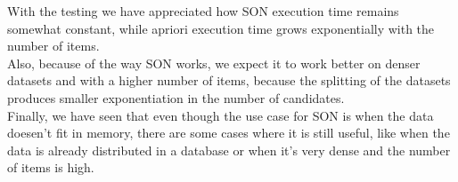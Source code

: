 \documentclass[a4paper]{article}
\begin{document}
	With the testing we have appreciated how SON execution time remains somewhat constant, while apriori execution time grows exponentially with the number of items.\\
	Also, because of the way SON works, we expect it to work better on denser datasets and with a higher number of items, because the splitting of the datasets produces
	smaller exponentiation in the number of candidates.\\
	
	Finally, we have seen that even though the use case for SON is when the data doesen't fit in memory, there are some cases where it is still useful, like when the data is
	already distributed in a database or when it's very dense and the number of items is high.\\
	
\end{document}

